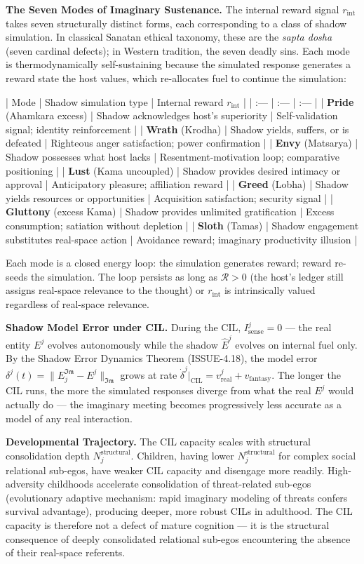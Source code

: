 \documentclass[11pt,a4paper]{article}
\theoremstyle{definition}
\theoremstyle{remark}
\begin{document}
\textbf{The Seven Modes of Imaginary Sustenance.} The internal reward signal $r_{\text{int}}$ takes seven structurally distinct forms, each corresponding to a class of shadow simulation. In classical Sanatan ethical taxonomy, these are the \textit{sapta dosha} (seven cardinal defects); in Western tradition, the seven deadly sins. Each mode is thermodynamically self-sustaining because the simulated response generates a reward state the host values, which re-allocates fuel to continue the simulation:

| Mode | Shadow simulation type | Internal reward $r_{\text{int}}$ |
| :--- | :--- | :--- |
| \textbf{Pride} (Ahamkara excess) | Shadow acknowledges host's superiority | Self-validation signal; identity reinforcement |
| \textbf{Wrath} (Krodha) | Shadow yields, suffers, or is defeated | Righteous anger satisfaction; power confirmation |
| \textbf{Envy} (Matsarya) | Shadow possesses what host lacks | Resentment-motivation loop; comparative positioning |
| \textbf{Lust} (Kama uncoupled) | Shadow provides desired intimacy or approval | Anticipatory pleasure; affiliation reward |
| \textbf{Greed} (Lobha) | Shadow yields resources or opportunities | Acquisition satisfaction; security signal |
| \textbf{Gluttony} (excess Kama) | Shadow provides unlimited gratification | Excess consumption; satiation without depletion |
| \textbf{Sloth} (Tamas) | Shadow engagement substitutes real-space action | Avoidance reward; imaginary productivity illusion |

Each mode is a closed energy loop: the simulation generates reward; reward re-seeds the simulation. The loop persists as long as $\mathcal{R} > 0$ (the host's ledger still assigns real-space relevance to the thought) or $r_{\text{int}}$ is intrinsically valued regardless of real-space relevance.

\textbf{Shadow Model Error under CIL.} During the CIL, $I_{\text{sense}}^j = 0$ — the real entity $E^j$ evolves autonomously while the shadow $\hat{E}^j$ evolves on internal fuel only. By the Shadow Error Dynamics Theorem (ISSUE-4.18), the model error $\delta^j(t) = \|E_j^{\mathfrak{Im}} - E^j\|_{\mathfrak{Im}}$ grows at rate $\dot{\delta}^j|_{\text{CIL}} = v^j_{\text{real}} + v_{\text{fantasy}}$. The longer the CIL runs, the more the simulated responses diverge from what the real $E^j$ would actually do — the imaginary meeting becomes progressively less accurate as a model of any real interaction.

\textbf{Developmental Trajectory.} The CIL capacity scales with structural consolidation depth $N_j^{\text{structural}}$. Children, having lower $N_j^{\text{structural}}$ for complex social relational sub-egos, have weaker CIL capacity and disengage more readily. High-adversity childhoods accelerate consolidation of threat-related sub-egos (evolutionary adaptive mechanism: rapid imaginary modeling of threats confers survival advantage), producing deeper, more robust CILs in adulthood. The CIL capacity is therefore not a defect of mature cognition — it is the structural consequence of deeply consolidated relational sub-egos encountering the absence of their real-space referents.
\end{document}
